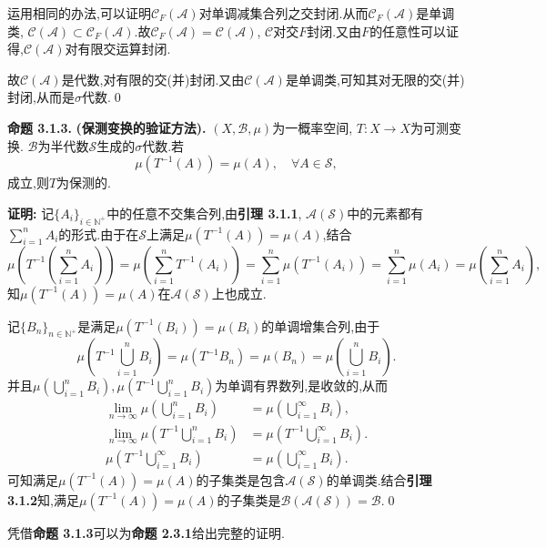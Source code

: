 运用相同的办法,可以证明$\mathcal{C}_F(\mathcal{A})$对单调减集合列之交封闭.从而$\mathcal{C}_F(\mathcal{A})$是单调类, $\mathcal{C}(\mathcal{A})\subset\mathcal{C}_F(\mathcal{A})$.故$\mathcal{C}_F(\mathcal{A})=\mathcal{C}(\mathcal{A})$, $\mathcal{C}$对交$F$封闭.又由$F$的任意性可以证得,$\mathcal{C}(\mathcal{A})$对有限交运算封闭.\par
故$\mathcal{C}(\mathcal{A})$是代数,对有限的交(并)封闭.又由$\mathcal{C}(\mathcal{A})$是单调类,可知其对无限的交(并)封闭,从而是$\sigma$代数.\qed
\par
\textbf{命题 3.1.3.  }\textsuperscript{\cite{Ergodic_Sun,Ergodic_theory}}\textbf{(保测变换的验证方法).  }
$(X,\mathcal{B},\mu)$为一概率空间, $T:X\to X$为可测变换. $\mathcal{B}$为半代数$\mathcal{S}$生成的$\sigma$代数.若
$$\mu(T^{-1}(A))=\mu(A),\quad \forall A\in \mathcal{S},$$
成立,则$T$为保测的.
\par
\textbf{证明:  }
记$\{A_i\}_{i\in\mathbb{N^+}}$中的任意不交集合列,由\textbf{引理 3.1.1}, $\mathcal{A}(\mathcal{S})$中的元素都有$\sum\limits_{i=1}^n A_i$的形式.由于在$\mathcal{S}$上满足$\mu(T^{-1}(A))=\mu(A)$,结合
$$\mu(T^{-1}(\sum\limits_{i=1}^n A_i))=\mu(\sum\limits_{i=1}^n T^{-1}(A_i))=\sum\limits_{i=1}^n\mu(T^{-1}(A_i))=\sum\limits_{i=1}^n\mu(A_i)=\mu(\sum\limits_{i=1}^n A_i),$$
知$\mu(T^{-1}(A))=\mu(A)$在$\mathcal{A}(\mathcal{S})$上也成立.\par
记$\{B_n\}_{n\in\mathbb{N}^+}$是满足$\mu(T^{-1}(B_i))=\mu(B_i)$的单调增集合列,由于
$$\mu\left(T^{-1}\bigcup_{i=1}^{n}B_{i}\right)=\mu\left(T^{-1}B_{n}\right)=
    \mu\left(B_{n}\right)=\mu\left(\bigcup_{i=1}^{n}B_{i}\right).$$
并且$\mu\left(\bigcup\limits_{i=1}^{n}B_{i}\right),\mu\left(T^{-1}\bigcup\limits_{i=1}^{n}B_{i}\right)$为单调有界数列,是收敛的,从而
\begin{align*}
    \lim_{n\to\infty}\mu\left(\bigcup\limits_{i=1}^{n}B_{i}\right)       & = \mu\left(\bigcup\limits_{i=1}^{\infty}B_{i}\right),       \\
    \lim_{n\to\infty}\mu\left(T^{-1}\bigcup\limits_{i=1}^{n}B_{i}\right) & = \mu\left(T^{-1}\bigcup\limits_{i=1}^{\infty}B_{i}\right). \\
    \mu\left(T^{-1}\bigcup_{i=1}^{\infty}B_{i}\right)                    & =\mu\left(\bigcup_{i=1}^{\infty}B_{i}\right).
\end{align*}
可知满足$\mu(T^{-1}(A))=\mu(A)$的子集类是包含$\mathcal{A}(\mathcal{S})$的单调类.结合\textbf{引理 3.1.2}知,满足$\mu(T^{-1}(A))=\mu(A)$的子集类是$\mathcal{B}(\mathcal{A}(\mathcal{S}))=\mathcal{B}$.\qed
\par
凭借\textbf{命题 3.1.3}可以为\textbf{命题 2.3.1}给出完整的证明.
